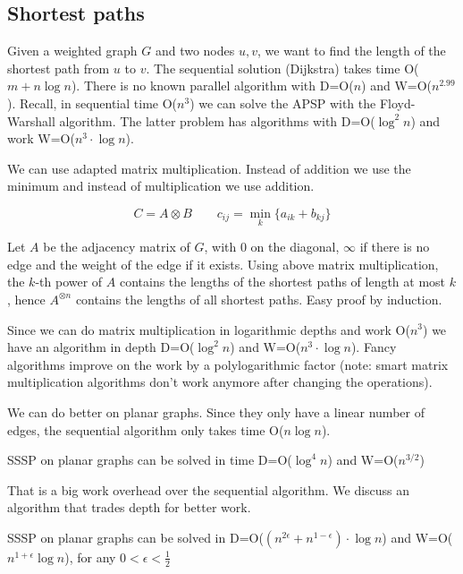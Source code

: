 \subsection{Shortest paths}

Given a weighted graph $G$ and two nodes $u,v$, we want to find the length of the shortest path from $u$ to $v$. The sequential solution (Dijkstra) takes time O($m+n\log n$). There is no known parallel algorithm with D=O($n$) and W=O($n^{2.99}$). Recall, in sequential time O($n^3$) we can solve the APSP with the Floyd-Warshall algorithm. The latter problem has algorithms with D=O($\log^2 n$) and work W=O($n^3\cdot \log n$).

We can use adapted matrix multiplication. Instead of addition we use the minimum and instead of multiplication we use addition.

\[C=A\otimes B\qquad c_{ij} = \min_k \{a_{ik} + b_{kj}\}\]

Let $A$ be the adjacency matrix of $G$, with $0$ on the diagonal, $\infty$ if there is no edge and the weight of the edge if it exists. Using above matrix multiplication, the $k$-th power of $A$ contains the lengths of the shortest paths of length at most $k$, hence $A^{\otimes n}$ contains the lengths of all shortest paths. Easy proof by induction.

Since we can do matrix multiplication in logarithmic depths and work O($n^3$) we have an algorithm in depth D=O($\log ^2 n$) and W=O($n^3\cdot \log n$). Fancy algorithms improve on the work by a polylogarithmic factor (note: smart matrix multiplication algorithms don't work anymore after changing the operations).

We can do better on planar graphs. Since they only have a linear number of edges, the sequential algorithm only takes time O($n \log n$).

\begin{thm}[Cohen 1996] SSSP on planar graphs can be solved in time D=O($\log ^4n$) and W=O($n^{3/2}$)\end{thm}

That is a big work overhead over the sequential algorithm. We discuss an algorithm that trades depth for better work.

\begin{thm} SSSP on planar graphs can be solved in D=O($(n^{2\epsilon} + n^{1-\epsilon})\cdot \log n$) and W=O($n^{1+\epsilon} \log n$), for any $0<\epsilon < \frac{1}{2}$\end{thm}

